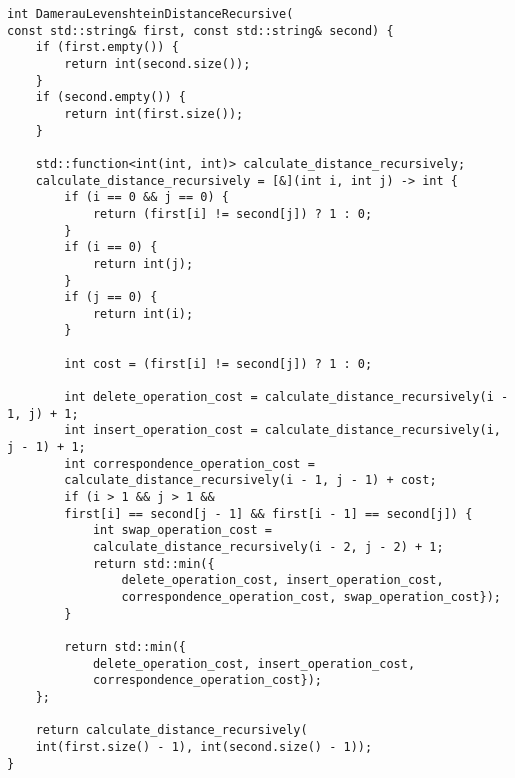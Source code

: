\begin{lstlisting}[caption=Рекурсивный алгоритм Дамерау-Левенштейна]
int DamerauLevenshteinDistanceRecursive(
const std::string& first, const std::string& second) {
	if (first.empty()) {
		return int(second.size());
	}
	if (second.empty()) {
		return int(first.size());
	}
	
	std::function<int(int, int)> calculate_distance_recursively;
	calculate_distance_recursively = [&](int i, int j) -> int {
		if (i == 0 && j == 0) {
			return (first[i] != second[j]) ? 1 : 0;
		}
		if (i == 0) {
			return int(j);
		}
		if (j == 0) {
			return int(i);
		}
		
		int cost = (first[i] != second[j]) ? 1 : 0;
		
		int delete_operation_cost = calculate_distance_recursively(i - 1, j) + 1;
		int insert_operation_cost = calculate_distance_recursively(i, j - 1) + 1;
		int correspondence_operation_cost =
		calculate_distance_recursively(i - 1, j - 1) + cost;
		if (i > 1 && j > 1 &&
		first[i] == second[j - 1] && first[i - 1] == second[j]) {
			int swap_operation_cost =
			calculate_distance_recursively(i - 2, j - 2) + 1;
			return std::min({
				delete_operation_cost, insert_operation_cost,
				correspondence_operation_cost, swap_operation_cost});
		}
		
		return std::min({
			delete_operation_cost, insert_operation_cost,
			correspondence_operation_cost});
	};
	
	return calculate_distance_recursively(
	int(first.size() - 1), int(second.size() - 1));
}
\end{lstlisting}


